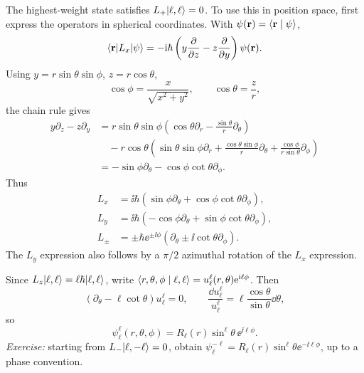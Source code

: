 The highest-weight state satisfies $L_+\lvert \ell,\ell\rangle=0$.
To use this in position space, first express the operators in spherical
coordinates. With $\psi(\mathbf r)=\langle \mathbf r\mid \psi\rangle$,
\[
 \langle \mathbf r\rvert L_x\lvert \psi\rangle
 =-\mathrm{i}\hbar\left(y\frac{\partial}{\partial z}
                 -z\frac{\partial}{\partial y}\right)\psi(\mathbf r).
\]
Using $y=r\sin\theta\sin\phi$, $z=r\cos\theta$,
\[
 \cos\phi=\frac{x}{\sqrt{x^2+y^2}},\qquad
 \cos\theta=\frac{z}{r},
\]
the chain rule gives
\begin{align*}
 y\partial_z-z\partial_y
 &=r\sin\theta\sin\phi
   \left(\cos\theta\partial_r-\frac{\sin\theta}{r}\partial_\theta\right)\\
 &\quad-r\cos\theta
   \left(\sin\theta\sin\phi\partial_r
    +\frac{\cos\theta\sin\phi}{r}\partial_\theta
    +\frac{\cos\phi}{r\sin\theta}\partial_\phi\right)\\
 &=-\sin\phi\partial_\theta-\cos\phi\cot\theta\partial_\phi.
\end{align*}
Thus
\begin{align*}
 L_x&=\ii\hbar\left(\sin\phi\partial_\theta
                         +\cos\phi\cot\theta\partial_\phi\right),\\
 L_y&=\ii\hbar\left(-\cos\phi\partial_\theta
                         +\sin\phi\cot\theta\partial_\phi\right),\\
 L_\pm&=\pm\hbar\ee^{\pm\ii\phi}
          \left(\partial_\theta\pm\ii\cot\theta\partial_\phi\right).
\end{align*}
The $L_y$ expression also follows by a $\pi/2$ azimuthal rotation of
the $L_x$ expression.

Since $L_z\lvert \ell,\ell\rangle=\ell\hbar\lvert \ell,\ell\rangle$, write
$\langle r,\theta,\phi\mid \ell,\ell\rangle
=u_\ell^\ell(r,\theta)\mathrm{e}^{\mathrm{i}\ell\phi}$. Then
\[
 (\partial_\theta-\ell\cot\theta)u_\ell^\ell=0,
 \qquad
 \frac{\dd u_\ell^\ell}{u_\ell^\ell}
 =\ell\frac{\cos\theta}{\sin\theta}\dd\theta,
\]
so
\[
 \psi_\ell^\ell(r,\theta,\phi)=R_\ell(r)\sin^\ell\theta\,
 \ee^{\ii\ell\phi}.
\]
\textit{Exercise:} starting from $L_-\lvert \ell,-\ell\rangle=0$, obtain
$\psi_\ell^{-\ell}=R_\ell(r)\sin^\ell\theta\ee^{-\ii\ell\phi}$,
up to a phase convention.
